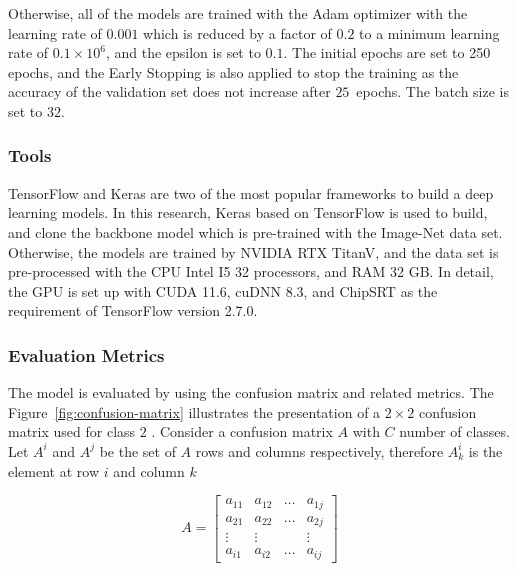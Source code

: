 \documentclass[sensors,article,accept,pdftex,moreauthors]{Definitions/mdpi}
\begin{document}
	Otherwise, all of the models are trained with the Adam {optimizer} %
 \cite{6980} with the learning rate of $0.001$ which is reduced by a factor of $0.2$ to a minimum learning rate of $0.1 \times 10^6$, and the epsilon is set to $0.1$. The initial epochs are set to 250 epochs, and the Early Stopping is also applied to stop the training as the accuracy of the validation set does not increase after $25$~epochs. The batch size is set to $32$.
	
	\subsubsection{Tools}
	TensorFlow and Keras are two of the most popular frameworks to build a deep learning models. In this research, Keras based on TensorFlow is used to build, and clone the backbone model which is pre-trained with the Image-Net data set. Otherwise, the models are trained by NVIDIA RTX TitanV, and the data set is pre-processed with the CPU Intel I5 32 processors, and RAM 32 GB. In detail, the GPU is set up with CUDA 11.6, cuDNN 8.3, and ChipSRT as the requirement of TensorFlow version 2.7.0.
	\subsubsection{Evaluation Metrics}

	The model is evaluated by using the confusion matrix and related metrics. The Figure~\ref{fig:confusion-matrix} illustrates the presentation of a $2 \times 2$ confusion matrix used for class $2$ . Consider a confusion matrix $A$ with $C$ number of classes. Let $A^i$ and $A^j$ be the set of $A$ rows and columns respectively, therefore $A^i_k$ is the element at row $i$ and column $k$
	
	\[
	A = \begin{bmatrix}
		a_{11} & a_{12} & \dots & a_{1j} \\
		a_{21} & a_{22} & \dots & a_{2j} \\
		\vdots & \vdots	&  & \vdots\\
		a_{i1} & a_{i2} & \dots & a_{ij} 
	\end{bmatrix}
	\]
\end{document}
